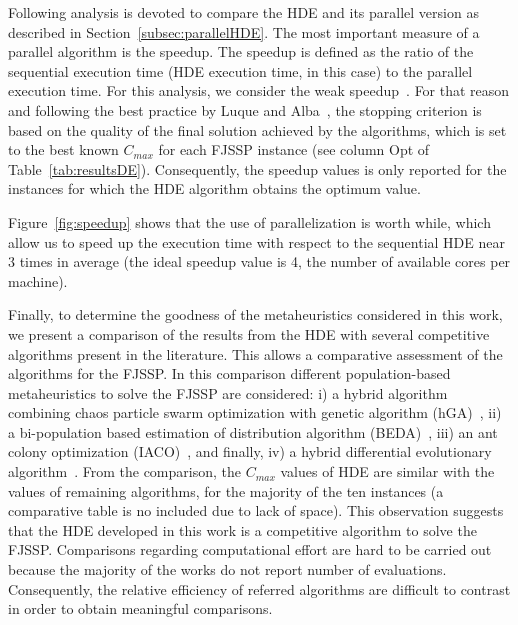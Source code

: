 
Following analysis is devoted to compare the HDE and its parallel version as described in Section~\ref{subsec:parallelHDE}. The most important measure of a parallel algorithm is the speedup. The speedup is defined as the ratio of the sequential execution time (HDE execution time, in this case) to the parallel execution time. For this analysis, we consider the weak speedup~\cite{albaMeta2005}. For that reason and following the best practice by Luque and Alba~\cite{Luque:2013:PGA:2564896}, the stopping criterion is based on the quality of the final solution achieved by the algorithms, which is set to the best known $C_{max}$ for each FJSSP instance (see column Opt of Table~\ref{tab:resultsDE}). Consequently, the speedup values is only reported  for the instances for which the HDE algorithm obtains the optimum value.%

Figure~\ref{fig:speedup} shows that the use of parallelization is worth while, which allow us to speed up the execution time with respect to the sequential HDE  near 3 times in average (the ideal speedup value is 4, the number of available cores per machine). 

Finally, to determine the goodness of the metaheuristics considered in this work, we present a comparison of the results from the HDE with several competitive algorithms present in the literature. This allows a comparative assessment of the algorithms for the FJSSP. In this comparison different population-based metaheuristics to solve the FJSSP are considered: i) a hybrid algorithm combining chaos particle swarm optimization with genetic algorithm (hGA)~\cite{tang2011}, ii) a bi-population based estimation of distribution algorithm (BEDA)~\cite{Wang2012917},  iii) an ant colony optimization (IACO)~\cite{WANG2017}, and finally, iv) a hybrid differential evolutionary algorithm~\cite{YUAN2013246}. From the comparison, the $C_{max}$ values of HDE are similar with the values of remaining algorithms, for the majority of the ten instances (a comparative table is no included due to lack of space). This observation suggests that the HDE developed in this work is a competitive algorithm to solve the FJSSP. Comparisons regarding computational effort are hard to be carried out because the majority of the works do not report number of evaluations. Consequently, the relative efficiency of referred algorithms are difficult to contrast in order to obtain meaningful comparisons.

